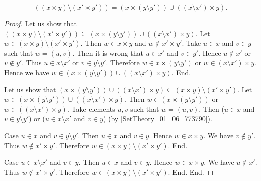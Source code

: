 \documentclass[../../set-theory.ftl.tex]{subfiles}
\begin{document}
  \begin{forthel}
    \begin{proposition}\label{SetTheory_01_06_247770}
      \[ ((x \times y) \setminus (x' \times y')) = (x \times (y \setminus y')) \cup ((x \setminus x') \times y). \]
    \end{proposition}
    \begin{proof}
      Let us show that $((x \times y) \setminus (x' \times y')) \subseteq (x \times (y \setminus y')) \cup ((x \setminus x') \times y)$.
        Let $w \in (x \times y) \setminus (x' \times y')$.
        Then $w \in x \times y$ and $w \notin x' \times y'$.
        Take $u \in x$ and $v \in y$ such that $w = (u,v)$.
        Then it is wrong that $u \in x'$ and $v \in y'$.
        Hence $u \notin x'$ or $v \notin y'$.
        Thus $u \in x \setminus x'$ or $v \in y \setminus y'$.
        Therefore $w \in x \times (y \setminus y')$ or $w \in (x \setminus x') \times y$.
        Hence we have $w \in (x \times (y \setminus y')) \cup ((x \setminus x') \times y)$.
      End.

      Let us show that $(x \times (y \setminus y')) \cup ((x \setminus x') \times y) \subseteq (x \times y) \setminus (x' \times y')$.
        Let $w \in (x \times (y \setminus y')) \cup ((x \setminus x') \times y)$.
        Then $w \in (x \times (y \setminus y'))$ or $w \in ((x \setminus x') \times y)$.
        Take elements $u,v$ such that $w = (u,v)$.
        Then ($u \in x$ and $v \in y \setminus y'$) or ($u \in x \setminus x'$ and $v \in y$) (by \ref{SetTheory_01_06_773790}).

        Case $u \in x$ and $v \in y \setminus y'$.
          Then $u \in x$ and $v \in y$.
          Hence $w \in x \times y$.
          We have $v \notin y'$.
          Thus $w \notin x' \times y'$.
          Therefore $w \in (x \times y) \setminus (x' \times y')$.
        End.

        Case $u \in x \setminus x'$ and $v \in y$.
          Then $u \in x$ and $v \in y$.
          Hence $w \in x \times y$.
          We have $u \notin x'$.
          Thus $w \notin x' \times y'$.
          Therefore $w \in (x \times y) \setminus (x' \times y')$.
        End.
      End.
    \end{proof}
  \end{forthel}
\end{document}
